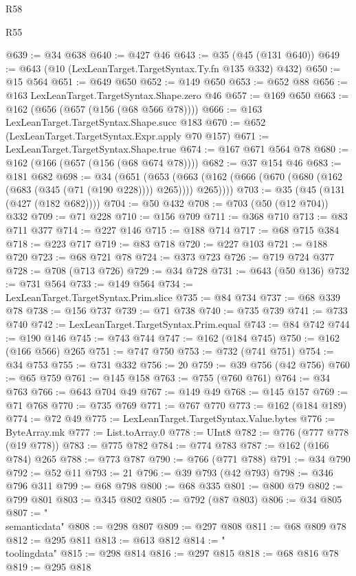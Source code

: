\begin{lexlean}{R58}
\begin{lexlean}{R55}
\begin{coremodule}
{{{{{{{{{{{{{{{{{{{{{{{{{{{{{{{{{{{{{{{{{{{{{{{{{{{{{{{{{{{{{{@639 := @34 @638
@640 := @427 @46
@643 := @35 (@45 (@131 @640))
@649 := @643 (@10 (LexLeanTarget.TargetSyntax.Ty.fn @135 @332) @432)
@650 := @15 @564
@651 := @649 @650
@652 := @149 @650
@653 := @652 @88
@656 := @163 LexLeanTarget.TargetSyntax.Shape.zero @46
@657 := @169 @650
@663 := @162 (@656 (@657 (@156 (@68 @566 @78))))
@666 := @163 LexLeanTarget.TargetSyntax.Shape.succ @183
@670 := @652 (LexLeanTarget.TargetSyntax.Expr.apply @70 @157)
@671 := LexLeanTarget.TargetSyntax.Shape.true
@674 := @167 @671 @564 @78
@680 := @162 (@166 (@657 (@156 (@68 @674 @78))))
@682 := @37 @154 @46
@683 := @181 @682
@698 := @34
    (@651
      (@653 (@663 (@162 (@666 (@670 (@680 (@162 (@683 (@345 (@71 (@190 @228)))) @265)))) @265))))
@703 := @35 (@45 (@131 (@427 (@182 @682))))
@704 := @50 @432
@708 := @703 (@50 (@12 @704)) @332
@709 := @71 @228
@710 := @156 @709
@711 := @368 @710
@713 := @83 @711 @377
@714 := @227 @146
@715 := @188 @714
@717 := @68 @715 @384
@718 := @223 @717
@719 := @83 @718
@720 := @227 @103
@721 := @188 @720
@723 := @68 @721 @78
@724 := @373 @723
@726 := @719 @724 @377
@728 := @708 (@713 @726)
@729 := @34 @728
@731 := @643 (@50 @136)
@732 := @731 @564
@733 := @149 @564
@734 := LexLeanTarget.TargetSyntax.Prim.slice
@735 := @84 @734
@737 := @68 @339 @78
@738 := @156 @737
@739 := @71 @738
@740 := @735 @739
@741 := @733 @740
@742 := LexLeanTarget.TargetSyntax.Prim.equal
@743 := @84 @742
@744 := @190 @146
@745 := @743 @744
@747 := @162 (@184 @745)
@750 := @162 (@166 @566) @265
@751 := @747 @750
@753 := @732 (@741 @751)
@754 := @34 @753
@755 := @731 @332
@756 := 20
@759 := @39 @756 (@42 @756)
@760 := @65 @759
@761 := @145 @158
@763 := @755 (@760 @761)
@764 := @34 @763
@766 := @643 @704 @49
@767 := @149 @49
@768 := @145 @157
@769 := @71 @768
@770 := @735 @769
@771 := @767 @770
@773 := @162 (@184 @189)
@774 := @72 @49
@775 := LexLeanTarget.TargetSyntax.Value.bytes
@776 := ByteArray.mk
@777 := List.toArray.{0}
@778 := UInt8
@782 := @776 (@777 @778 (@19 @778))
@783 := @775 @782
@784 := @774 @783
@787 := @162 (@166 @784) @265
@788 := @773 @787
@790 := @766 (@771 @788)
@791 := @34 @790
@792 := @52 @11
@793 := 21
@796 := @39 @793 (@42 @793)
@798 := @346 @796 @311
@799 := @68 @798
@800 := @68 @335
@801 := @800 @79
@802 := @799 @801
@803 := @345 @802
@805 := @792 (@87 @803)
@806 := @34 @805
@807 := "\\semanticdata"
@808 := @298 @807
@809 := @297 @808
@811 := @68 @809 @78
@812 := @295 @811
@813 := @613 @812
@814 := "\\toolingdata"
@815 := @298 @814
@816 := @297 @815
@818 := @68 @816 @78
@819 := @295 @818
}}}}}}}}}}}}}}}}}}}}}}}}}}}}}}}}}}}}}}}}}}}}}}}}}}}}}}}}}}}}}}
\end{coremodule}
\end{lexlean}
\end{lexlean}
